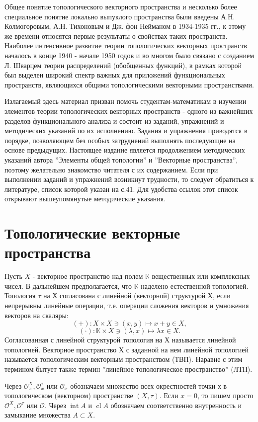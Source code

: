 \documentclass[a4paper, 12pt]{article}
\theoremstyle{definition}
\theoremstyle{remark}
\DeclareMathOperator{\Int}{int}
\DeclareMathOperator{\clo}{cl}
\begin{document}
Общее понятие топологического векторного пространства и несколько
более специальное понятие локально выпуклого пространства были введены
А.Н. Колмогоровым, А.Н. Тихоновым и Дж. фон Нейманом в 1934-1935 гг., 
к этому же времени относятся первые результаты о свойствах таких пространств.
Наиболее интенсивное развитие теории топологических векторных пространств началось
в конце 1940 - начале 1950 годов и во многом было связано с созданием Л. Шварцем теории
распределений (обобщенных функций), в рамках которой был выделен широкий спектр важных для приложений
функциональных пространств, являющихся общими топологическими векторными пространствами.

Излагаемый здесь материал призван помочь студентам-математикам в изучении элементов
теории топологических векторных пространств - одного из важнейших разделов функционального анализа и состоит из
заданий, упражнений и методических указаний по их исполнению. Задания и упражнения приводятся в порядке,
позволяющем без особых затруднений выполнять последующие на основе предыдущих. Настоящее
издание является продолжением методических указаний автора ''Элементы общей топологии''
и ''Векторные пространства'', поэтому желательно знакомство читателя с их содержанием.
Если при выполнении заданий и упражнений возникнут трудности, то следует обратиться к литературе,
список которой указан на с.41. Для удобства ссылок этот список открывают вышеупомянутые методические указания.

\section{Топологические векторные пространства}

Пусть $X$ - векторное пространство над полем $\mathbb{K}$ вещественных или комплексных чисел.
В дальнейшем предполагается, что $\mathbb{K}$ наделено естественной топологией.
Топология $\tau$ на Х согласована с линейной (векторной) структурой Х, 
если непрерывны линейные операции, т.е. операции сложения векторов и умножения векторов
на скаляры:
\[(+): X\times X \ni (x, y) \longmapsto x+y \in X,\]
\[(\cdot ): \mathbb{K} \times X \ni (\lambda, x)\longmapsto \lambda x \in X.\]
Согласованная с линейной структурой топология на Х называется линейной топологией.
Векторное пространство Х с заданной на нем линейной топологией называется топологическим
векторным пространством (ТВП). Наравне с этим термином бытует также термин ''линейное топологическое пространство'' (ЛТП).

Через $\mathcal{O} _x^X, \mathcal{O} _x^\tau$ или $\mathcal{O} _x$ обозначаем множество
всех окрестностей точки х в топологическом (векторном) пространстве $(X, \tau)$.
Если $x = 0$, то пишем просто $\mathcal{O} ^X, \mathcal{O}^\tau$ или $\mathcal{O} $.
Через $\Int A$ и $\clo A$ обозначаем соответственно внутренность и замыкание множества
$A\subset X$.
\end{document}
